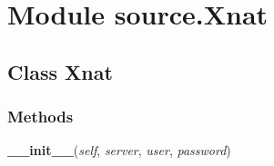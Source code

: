 %
%
%


\section{Module source.Xnat}

    \label{source:Xnat}


\subsection{Class Xnat}

    \label{source:Xnat:Xnat}


  \subsubsection{Methods}

    \label{source:Xnat:Xnat:__init__}

    \vspace{0.5ex}

\hspace{.8\funcindent}\begin{boxedminipage}{\funcwidth}

    \raggedright \textbf{\_\_init\_\_}(\textit{self}, \textit{server}, \textit{user}, \textit{password})

\setlength{\parskip}{2ex}
\setlength{\parskip}{1ex}
    \end{boxedminipage}

